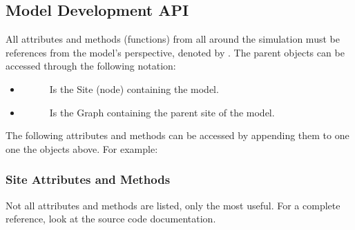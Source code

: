 \documentclass[letterpaper,10pt,english]{sphinxmanual}
\begin{document}
\subsection{Model Development API}
\label{\detokenize{scripting:model-development-api}}
All attributes and methods (functions) from all around the simulation must be references from the model’s  perspective, denoted by . The parent objects can be accessed through the following notation:
\begin{itemize}
\item {} \begin{description}
\item[{}] \leavevmode
Is the Site (node) containing the model.

\end{description}

\item {} \begin{description}
\item[{}] \leavevmode
Is the Graph containing the parent site of the model.

\end{description}

\end{itemize}

The following attributes and methods can be accessed by appending them to one one the objects above. For example:

\begin{sphinxVerbatim}[commandchars=\\\{\}]
\end{sphinxVerbatim}


\subsubsection{Site Attributes and Methods}
\label{\detokenize{scripting:site-attributes-and-methods}}
Not all attributes and methods are listed, only the most useful. For a complete reference, look at the source code documentation.
\end{document}
